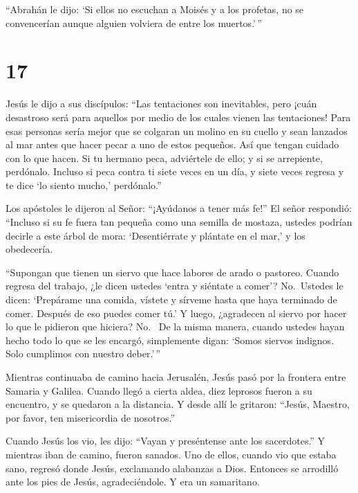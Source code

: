  ``Abrahán le dijo: `Si ellos no escuchan a Moisés y a los
profetas, no se convencerían aunque alguien volviera de entre los
muertos.'\,''

\hypertarget{section-16}{%
\section{17}\label{section-16}}

 Jesús le dijo a sus discípulos: ``Las tentaciones son
inevitables, pero ¡cuán desastroso será para aquellos por medio de los
cuales vienen las tentaciones!  Para esas personas sería
mejor que se colgaran un molino en su cuello y sean lanzados al mar
antes que hacer pecar a uno de estos pequeños.  Así que
tengan cuidado con lo que hacen. Si tu hermano peca, adviértele de ello;
y si se arrepiente, perdónalo.  Incluso si peca contra ti
siete veces en un día, y siete veces regresa y te dice `lo siento
mucho,' perdónalo.''

 Los apóstoles le dijeron al Señor: ``¡Ayúdanos a tener más
fe!''  El señor respondió: ``Incluso si su fe fuera tan
pequeña como una semilla de mostaza, ustedes podrían decirle a este
árbol de mora: `Desentiérrate y plántate en el mar,' y los obedecería.

 ``Supongan que tienen un siervo que hace labores de arado o
pastoreo. Cuando regresa del trabajo, ¿le dicen ustedes `entra y
siéntate a comer'?  No.~Ustedes le dicen: `Prepárame una
comida, vístete y sírveme hasta que haya terminado de comer. Después de
eso puedes comer tú.'  Y luego, ¿agradecen al siervo por
hacer lo que le pidieron que hiciera? No.~ De la misma
manera, cuando ustedes hayan hecho todo lo que se les encargó,
simplemente digan: `Somos siervos indignos. Solo cumplimos con nuestro
deber.'\,''

 Mientras continuaba de camino hacia Jerusalén, Jesús pasó
por la frontera entre Samaria y Galilea.  Cuando llegó a
cierta aldea, diez leprosos fueron a su encuentro, y se quedaron a la
distancia.  Y desde allí le gritaron: ``Jesús, Maestro, por
favor, ten misericordia de nosotros.''

 Cuando Jesús los vio, les dijo: ``Vayan y preséntense ante
los sacerdotes.'' Y mientras iban de camino, fueron sanados.
 Uno de ellos, cuando vio que estaba sano, regresó donde
Jesús, exclamando alabanzas a Dios.  Entonces se arrodilló
ante los pies de Jesús, agradeciéndole. Y era un samaritano.

